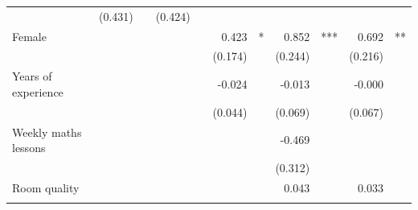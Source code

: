 \documentclass{article}
\begin{document}
\begin{table}[!h]
\begin{tabular}{lllllllllll}
  \multicolumn{1}{l}{} &
  \multicolumn{1}{r}{(0.431)} &
  \multicolumn{1}{l}{} &
  \multicolumn{1}{r}{(0.424)} &
  \multicolumn{1}{l}{} \\
\multicolumn{1}{l}{Female} &
  \multicolumn{1}{r}{} &
  \multicolumn{1}{l}{} &
  \multicolumn{1}{r}{} &
  \multicolumn{1}{l}{} &
  \multicolumn{1}{r}{0.423} &
  \multicolumn{1}{l}{*} &
  \multicolumn{1}{r}{0.852} &
  \multicolumn{1}{l}{***} &
  \multicolumn{1}{r}{0.692} &
  \multicolumn{1}{l}{**} \\
\multicolumn{1}{l}{} &
  \multicolumn{1}{r}{} &
  \multicolumn{1}{l}{} &
  \multicolumn{1}{r}{} &
  \multicolumn{1}{l}{} &
  \multicolumn{1}{r}{(0.174)} &
  \multicolumn{1}{l}{} &
  \multicolumn{1}{r}{(0.244)} &
  \multicolumn{1}{l}{} &
  \multicolumn{1}{r}{(0.216)} &
  \multicolumn{1}{l}{} \\
\multicolumn{1}{l}{Years of experience} &
  \multicolumn{1}{r}{} &
  \multicolumn{1}{l}{} &
  \multicolumn{1}{r}{} &
  \multicolumn{1}{l}{} &
  \multicolumn{1}{r}{-0.024} &
  \multicolumn{1}{l}{} &
  \multicolumn{1}{r}{-0.013} &
  \multicolumn{1}{l}{} &
  \multicolumn{1}{r}{-0.000} &
  \multicolumn{1}{l}{} \\
\multicolumn{1}{l}{} &
  \multicolumn{1}{r}{} &
  \multicolumn{1}{l}{} &
  \multicolumn{1}{r}{} &
  \multicolumn{1}{l}{} &
  \multicolumn{1}{r}{(0.044)} &
  \multicolumn{1}{l}{} &
  \multicolumn{1}{r}{(0.069)} &
  \multicolumn{1}{l}{} &
  \multicolumn{1}{r}{(0.067)} &
  \multicolumn{1}{l}{} \\
\multicolumn{1}{l}{Weekly maths lessons} &
  \multicolumn{1}{r}{} &
  \multicolumn{1}{l}{} &
  \multicolumn{1}{r}{} &
  \multicolumn{1}{l}{} &
  \multicolumn{1}{r}{} &
  \multicolumn{1}{l}{} &
  \multicolumn{1}{r}{-0.469} &
  \multicolumn{1}{l}{} &
  \multicolumn{1}{r}{} &
  \multicolumn{1}{l}{} \\
\multicolumn{1}{l}{} &
  \multicolumn{1}{r}{} &
  \multicolumn{1}{l}{} &
  \multicolumn{1}{r}{} &
  \multicolumn{1}{l}{} &
  \multicolumn{1}{r}{} &
  \multicolumn{1}{l}{} &
  \multicolumn{1}{r}{(0.312)} &
  \multicolumn{1}{l}{} &
  \multicolumn{1}{r}{} &
  \multicolumn{1}{l}{} \\
\multicolumn{1}{l}{Room quality} &
  \multicolumn{1}{r}{} &
  \multicolumn{1}{l}{} &
  \multicolumn{1}{r}{} &
  \multicolumn{1}{l}{} &
  \multicolumn{1}{r}{} &
  \multicolumn{1}{l}{} &
  \multicolumn{1}{r}{0.043} &
  \multicolumn{1}{l}{} &
  \multicolumn{1}{r}{0.033} &
  \multicolumn{1}{l}{} \\
\multicolumn{1}{l}{} &
  \multicolumn{1}{r}{} &
  \multicolumn{1}{l}{} &

\end{tabular}
\end{table}
\end{document}
